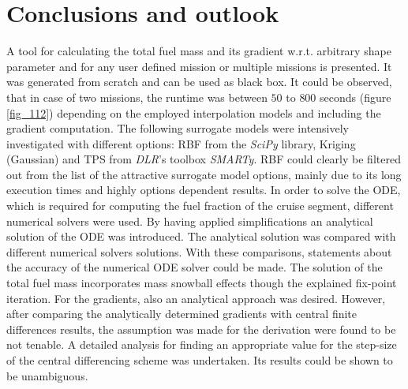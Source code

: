 
\chapter{Conclusions and outlook}
A tool for calculating the total fuel mass and 
its gradient w.r.t. arbitrary shape parameter and for any 
user defined mission or multiple missions is presented.
It was generated from scratch and can be used 
as black box. 
It could be observed, that in case of two 
missions, the runtime was between $50$ to $800$ seconds 
(figure \ref{fig_112}) depending on the employed 
interpolation models and including the gradient computation.
 The following surrogate models 
were intensively investigated with different options:
RBF from the \emph{SciPy} library, Kriging (Gaussian) and TPS
from \emph{DLR}'s toolbox \emph{SMARTy}. RBF 
could clearly be filtered out from the list of the 
attractive surrogate model options, mainly 
due to its long execution times and 
highly options dependent results. In order to solve 
the ODE, which is required for 
computing the fuel fraction of the
cruise segment, different numerical solvers were used. 
By having 
applied simplifications an analytical solution of 
the ODE was introduced. The analytical solution 
was compared with different numerical solvers solutions. 
With these comparisons, 
statements about the accuracy of the numerical 
ODE solver could be made. The solution 
of the total fuel mass incorporates
mass snowball effects though the explained 
fix-point iteration. For the gradients, also 
an analytical approach was desired.
%
However, after comparing the analytically 
determined gradients with central finite 
differences results, the assumption was made for the derivation
were found to be not tenable.
%
A detailed analysis 
for finding an appropriate value for the step-size 
of the central differencing scheme was undertaken. Its 
results could be shown to be unambiguous. \newline 

